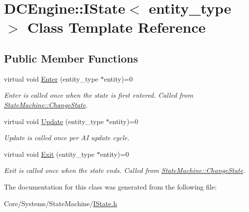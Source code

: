 \hypertarget{classDCEngine_1_1IState}{\section{D\-C\-Engine\-:\-:I\-State$<$ entity\-\_\-type $>$ Class Template Reference}
\label{classDCEngine_1_1IState}
}
\subsection*{Public Member Functions}
\begin{DoxyCompactItemize}
\item 
\hypertarget{classDCEngine_1_1IState_a25a7b2eaab32f1025619a348d27040af}{virtual void \hyperlink{classDCEngine_1_1IState_a25a7b2eaab32f1025619a348d27040af}{Enter} (entity\-\_\-type $\ast$entity)=0}\label{classDCEngine_1_1IState_a25a7b2eaab32f1025619a348d27040af}

\begin{DoxyCompactList}\small\item\em Enter is called once when the state is first entered. Called from \hyperlink{classDCEngine_1_1StateMachine_ab73e7a9bd5f09f6b6a91eddaad4deb74}{State\-Machine\-::\-Change\-State}. \end{DoxyCompactList}\item 
\hypertarget{classDCEngine_1_1IState_a5a78c5854e32f835e78df6e2c75395e5}{virtual void \hyperlink{classDCEngine_1_1IState_a5a78c5854e32f835e78df6e2c75395e5}{Update} (entity\-\_\-type $\ast$entity)=0}\label{classDCEngine_1_1IState_a5a78c5854e32f835e78df6e2c75395e5}

\begin{DoxyCompactList}\small\item\em Update is called once per A\-I update cycle. \end{DoxyCompactList}\item 
\hypertarget{classDCEngine_1_1IState_ac69af84e8d21dd25201e6afac617c017}{virtual void \hyperlink{classDCEngine_1_1IState_ac69af84e8d21dd25201e6afac617c017}{Exit} (entity\-\_\-type $\ast$entity)=0}\label{classDCEngine_1_1IState_ac69af84e8d21dd25201e6afac617c017}

\begin{DoxyCompactList}\small\item\em Exit is called once when the state ends. Called from \hyperlink{classDCEngine_1_1StateMachine_ab73e7a9bd5f09f6b6a91eddaad4deb74}{State\-Machine\-::\-Change\-State}. \end{DoxyCompactList}\end{DoxyCompactItemize}


The documentation for this class was generated from the following file\-:\begin{DoxyCompactItemize}
\item 
Core/\-Systems/\-State\-Machine/\hyperlink{IState_8h}{I\-State.\-h}\end{DoxyCompactItemize}
